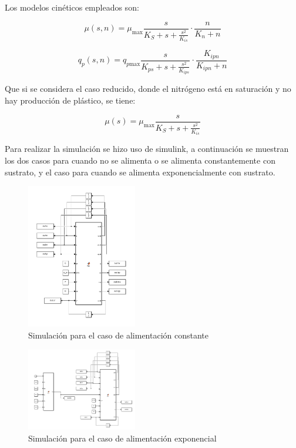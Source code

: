 \documentclass[letterpaper, 10 pt, conference]{ieeeconf}  %
\begin{document}
\vspace{0.35cm}

Los modelos cinéticos empleados son:

\begin{equation*}
\mu(s,n) = \mu_{\text{max}} \frac{s}{K_S + s + \frac{s^2}{K_{is}}} \cdot \frac{n}{K_n + n}
\end{equation*}

\begin{equation*}
q_p(s,n) = q_{p\text{max}} \frac{s}{K_{ps} + s + \frac{s^2}{K_{ips}}} \cdot \frac{K_{ipn}}{K_{ipn} + n}
\end{equation*}

Que si se considera el caso reducido, donde el nitrógeno está en saturación y no hay producción de plástico, se tiene:

\begin{equation*}
\mu(s) = \mu_{\text{max}} \frac{s}{K_S + s + \frac{s^2}{K_{is}}} 
\end{equation*}

Para realizar la simulación se hizo uso de simulink, a continuación se muestran los dos casos para cuando no se alimenta o se alimenta constantemente con sustrato, y el caso para cuando se alimenta exponencialmente con sustrato.

\begin{figure}[H]
  \centering
  \includegraphics[width=0.43\textwidth]{./Images_tp1/simulink1.png}
  \caption{Simulación para el caso de alimentación constante}
  \label{fig:simulink1}
\end{figure}
\begin{figure}[H]
  \centering
  \includegraphics[width=0.43\textwidth]{./Images_tp1/simulink2.png}
  \caption{Simulación para el caso de alimentación exponencial}
  \label{fig:simulink2}
\end{figure}
\end{document}
